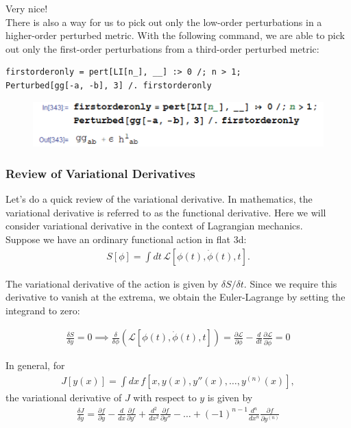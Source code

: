 \documentclass{book}
\theoremstyle{definition}
\newcommand{\p}{\partial}
\newcommand{\lag}{\mathcal{L}}
\newcommand{\f}[2]{\frac{#1}{#2}}
\newcommand{\lp}{\left(}
\newcommand{\rp}{\right)}
\begin{document}
Very nice!\\


There is also a way for us to pick out only the low-order perturbations in a higher-order perturbed metric. With the following command, we are able to pick out only the first-order perturbations from a third-order perturbed metric: 
\begin{lstlisting}
firstorderonly = pert[LI[n_], __] :> 0 /; n > 1; 
Perturbed[gg[-a, -b], 3] /. firstorderonly
\end{lstlisting}
\begin{figure}[!htb]
	\includegraphics[scale=0.3]{pickout}
\end{figure}








\subsubsection{Review of Variational Derivatives}

Let’s do a quick review of the variational derivative. In mathematics, the variational derivative is referred to as the functional derivative. Here we will consider
variational derivative in the context of Lagrangian mechanics.\\

Suppose we have an ordinary functional action in flat 3d:
\begin{align}
S[\phi] = \int dt\,\lag[\phi(t),\dot{\phi}(t),t].
\end{align}


The variational derivative of the action is given by $\delta S/ \delta t$. Since we require this derivative to vanish at the extrema, we obtain the Euler-Lagrange by setting
the integrand to zero:

\begin{align}
\f{\delta S}{\delta y} = 0 \implies \f{\delta }{\delta \phi} \lp \lag[\phi(t),\dot{\phi}(t),t] \rp  = \boxed{\f{\p \lag}{\p \phi} - \f{d}{dt}\f{\p \lag}{\p \dot{\phi}} = 0}
\end{align}


In general, for
\begin{align}
J[y(x)] = \int dx\,f[x,y(x),y''(x),\dots,y^{(n)}(x)],
\end{align}
the variational derivative of $J$ with respect to $y$ is given by
\begin{align}
\boxed{\f{\delta J}{\delta y} = \f{\p f}{\p y} - \f{d}{dx}\f{\p f}{\p y'} + \f{d^2}{dx^2}\f{\p f}{\p y''} - \dots + (-1)^{n-1}\f{d^n}{dx^n}\f{\p f}{\p y^{(n)}}}
\end{align}
\end{document}
